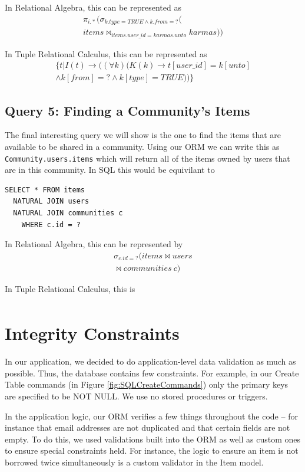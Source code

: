 \documentclass{acm_proc_article-sp}
\begin{document}
In Relational Algebra, this can be represented as
\[ \begin{split}
\pi_{i.*}(\sigma_{k.type=TRUE \land k.from=?}( \\
  items \bowtie_{items.user\_id=karmas.unto} karmas))
\end{split}\]

In Tuple Relational Calculus, this can be represented as
\[ 
\begin{split} \{ t | I(t) \to ((\forall k) (K(k) \to t[user\_id] = k[unto] \\
\land k[from] = ? \land k[type] = TRUE)) \} \end{split} \]

\subsection{Query 5: Finding a Community's Items}
The final interesting query we will show is the one to find the items that are available to be shared in a community.  Using our ORM we can write this as \texttt{Community.users.items} which will return all of the items owned by users that are in this community. In SQL this would be equivilant to 
\begin{lstlisting}
SELECT * FROM items 
  NATURAL JOIN users  
  NATURAL JOIN communities c
    WHERE c.id = ?
\end{lstlisting}

In Relational Algebra, this can be represented by
\[
\begin{split}
  \sigma_{c.id=?}(items \bowtie users \\
    \bowtie communities~c)
\end{split}
\]

In Tuple Relational Calculus, this is
\[
\begin{split}

\end{split}
\]

\section{Integrity Constraints}
In our application, we decided to do application-level data validation as much as possible. Thus, the database
contains few constraints. For example, in our Create Table commands (in Figure \ref{fig:SQLCreateCommands}) only
the primary keys are specified to be NOT NULL. We use no stored procedures or triggers.

In the application logic, our ORM verifies a few things throughout the code -- for instance that email addresses 
are not duplicated and that certain fields are not empty. To do this, we used validations built into the ORM as
well as custom ones to ensure special constraints held. For instance, the logic to ensure an item is not borrowed
twice simultaneously is a custom validator in the Item model.
\end{document}
